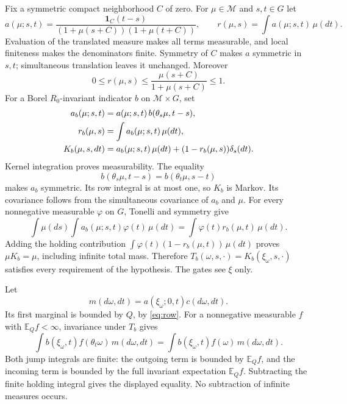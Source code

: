 \documentclass[11pt]{article}
\newcommand{\MM}{\mathcal M}
\newcommand{\ind}{\mathbf 1}
\newcommand{\EQ}{\mathbb E_Q}
\begin{document}
Fix a symmetric compact neighborhood $C$ of zero. For $\mu\in\MM$ and $s,t\in G$ let
\begin{equation}
 a(\mu;s,t)=
 \frac{\ind_C(t-s)}{(1+\mu(s+C))(1+\mu(t+C))},
 \qquad r(\mu,s)=\int a(\mu;s,t)\,\mu(dt). \label{eq:conductance}
\end{equation}
Evaluation of the translated measure makes all terms measurable, and local finiteness makes the denominators finite. Symmetry of $C$ makes $a$ symmetric in $s,t$; simultaneous translation leaves it unchanged. Moreover
\begin{equation}
 0\leq r(\mu,s)\leq\frac{\mu(s+C)}{1+\mu(s+C)}\leq1. \label{eq:row}
\end{equation}
For a Borel $R_0$-invariant indicator $b$ on $\MM\times G$, set
\begin{align}
 a_b(\mu;s,t)&=a(\mu;s,t)\,b(\theta_s\mu,t-s),\notag\\
 r_b(\mu,s)&=\int a_b(\mu;s,t)\,\mu(dt),\notag\\
 K_b(\mu,s,dt)&=a_b(\mu;s,t)\,\mu(dt)
                  +(1-r_b(\mu,s))\delta_s(dt). \label{eq:lazy}
\end{align}
Kernel integration proves measurability. The equality
\[
 b(\theta_s\mu,t-s)=b(\theta_t\mu,s-t)
\]
makes $a_b$ symmetric. Its row integral is at most one, so $K_b$ is Markov. Its covariance follows from the simultaneous covariance of $a_b$ and $\mu$. For every nonnegative measurable $\varphi$ on $G$, Tonelli and symmetry give
\[
 \int\mu(ds)\int a_b(\mu;s,t)\varphi(t)\,\mu(dt)
 =\int \varphi(t)r_b(\mu,t)\,\mu(dt).
\]
Adding the holding contribution $\int\varphi(t)(1-r_b(\mu,t))\,\mu(dt)$ proves $\mu K_b=\mu$, including infinite total mass. Therefore $T_b(\omega,s,\cdot)=K_b(\xi_\omega,s,\cdot)$ satisfies every requirement of the hypothesis. The gates see $\xi$ only.

Let
\[
 m(d\omega,dt)=a(\xi_\omega;0,t)c(d\omega,dt).
\]
Its first marginal is bounded by $Q$, by \eqref{eq:row}. For a nonnegative measurable $f$ with $\EQ f<\infty$, invariance under $T_b$ gives
\begin{equation}
 \int b(\xi_\omega,t)f(\theta_t\omega)\,m(d\omega,dt)
 =\int b(\xi_\omega,t)f(\omega)\,m(d\omega,dt). \label{eq:finite}
\end{equation}
Both jump integrals are finite: the outgoing term is bounded by $\EQ f$, and the incoming term is bounded by the full invariant expectation $\EQ f$. Subtracting the finite holding integral gives the displayed equality. No subtraction of infinite measures occurs.
\end{document}
